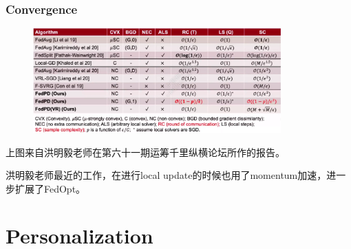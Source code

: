 
\begin{frame}
\frametitle{Convergence}

\begin{figure}
    \centering
    \includegraphics[keepaspectratio,width=0.85\textwidth]{images/mingyi_hong_fedpd.png}
\end{figure}
上图来自洪明毅老师在第六十一期运筹千里纵横论坛所作的报告。

\pause
\vspace{0.4em}

洪明毅老师最近的工作\cite{khanduri2021stem}，在进行local update的时候也用了momentum加速，进一步扩展了FedOpt。


\end{frame}


\section{Personalization}


